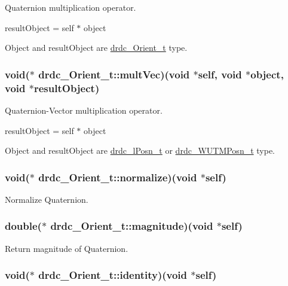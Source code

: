 Quaternion multiplication operator. 

resultObject = self $\ast$ object

Object and resultObject are \hyperlink{structdrdc__Orient__t}{drdc\_\-Orient\_\-t} type. \hypertarget{structdrdc__Orient__t_0fca278ef2257a2c645c0c1e1a46a9ac}{
\subsubsection[multVec]{\setlength{\rightskip}{0pt plus 5cm}void($\ast$ {\bf drdc\_\-Orient\_\-t::multVec})(void $\ast$self, void $\ast$object, void $\ast$resultObject)}}
\label{structdrdc__Orient__t_0fca278ef2257a2c645c0c1e1a46a9ac}


Quaternion-Vector multiplication operator. 

resultObject = self $\ast$ object

Object and resultObject are \hyperlink{structdrdc__lPosn__t}{drdc\_\-lPosn\_\-t} or \hyperlink{structdrdc__WUTMPosn__t}{drdc\_\-WUTMPosn\_\-t} type. \hypertarget{structdrdc__Orient__t_ac3a732bfd83f0a8053bc47f61217426}{
\subsubsection[normalize]{\setlength{\rightskip}{0pt plus 5cm}void($\ast$ {\bf drdc\_\-Orient\_\-t::normalize})(void $\ast$self)}}
\label{structdrdc__Orient__t_ac3a732bfd83f0a8053bc47f61217426}


Normalize Quaternion. 

\hypertarget{structdrdc__Orient__t_1ec8cc2750eb72e3b1bb299623c7ea33}{
\subsubsection[magnitude]{\setlength{\rightskip}{0pt plus 5cm}double($\ast$ {\bf drdc\_\-Orient\_\-t::magnitude})(void $\ast$self)}}
\label{structdrdc__Orient__t_1ec8cc2750eb72e3b1bb299623c7ea33}


Return magnitude of Quaternion. 

\hypertarget{structdrdc__Orient__t_f7869b90e7daf9ef2a7393ca730ffd0e}{
\subsubsection[identity]{\setlength{\rightskip}{0pt plus 5cm}void($\ast$ {\bf drdc\_\-Orient\_\-t::identity})(void $\ast$self)}}
\label{structdrdc__Orient__t_f7869b90e7daf9ef2a7393ca730ffd0e}


